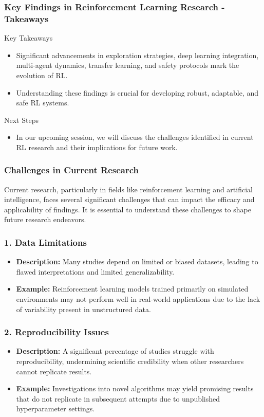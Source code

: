 \documentclass[aspectratio=169]{beamer}
\begin{document}
\begin{frame}[fragile]
    \frametitle{Key Findings in Reinforcement Learning Research - Takeaways}
    \begin{block}{Key Takeaways}
        \begin{itemize}
            \item Significant advancements in exploration strategies, deep learning integration, multi-agent dynamics, transfer learning, and safety protocols mark the evolution of RL.
            \item Understanding these findings is crucial for developing robust, adaptable, and safe RL systems.
        \end{itemize}
    \end{block}

    \begin{block}{Next Steps}
        \begin{itemize}
            \item In our upcoming session, we will discuss the challenges identified in current RL research and their implications for future work.
        \end{itemize}
    \end{block}
\end{frame}

\begin{frame}[fragile]
    \frametitle{Challenges in Current Research}
    Current research, particularly in fields like reinforcement learning and artificial intelligence, faces several significant challenges that can impact the efficacy and applicability of findings. It is essential to understand these challenges to shape future research endeavors.
\end{frame}

\begin{frame}[fragile]
    \frametitle{1. Data Limitations}
    \begin{itemize}
        \item \textbf{Description:} Many studies depend on limited or biased datasets, leading to flawed interpretations and limited generalizability.
        \item \textbf{Example:} Reinforcement learning models trained primarily on simulated environments may not perform well in real-world applications due to the lack of variability present in unstructured data.
    \end{itemize}
\end{frame}

\begin{frame}[fragile]
    \frametitle{2. Reproducibility Issues}
    \begin{itemize}
        \item \textbf{Description:} A significant percentage of studies struggle with reproducibility, undermining scientific credibility when other researchers cannot replicate results.
        \item \textbf{Example:} Investigations into novel algorithms may yield promising results that do not replicate in subsequent attempts due to unpublished hyperparameter settings.
    \end{itemize}
\end{frame}
\end{document}
